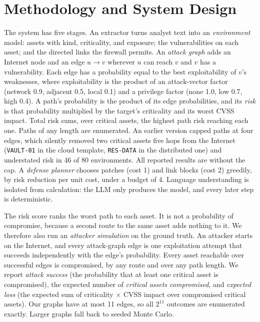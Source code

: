 \documentclass[11pt]{article}
\begin{document}
\section{Methodology and System Design}
The system has five stages. An extractor turns analyst text into an \emph{environment} model: assets with kind, criticality, and exposure; the vulnerabilities on each asset; and the directed links the firewall permits. An \emph{attack graph} adds an Internet node and an edge $u \rightarrow v$ wherever $u$ can reach $v$ and $v$ has a vulnerability. Each edge has a probability equal to the best exploitability of $v$'s weaknesses, where exploitability is the product of an attack-vector factor (network 0.9, adjacent 0.5, local 0.1) and a privilege factor (none 1.0, low 0.7, high 0.4). A path's probability is the product of its edge probabilities, and its \emph{risk} is that probability multiplied by the target's criticality and its worst CVSS impact. Total risk sums, over critical assets, the highest path risk reaching each one. Paths of any length are enumerated. An earlier version capped paths at four edges, which silently removed two critical assets five hops from the Internet (\texttt{VAULT-01} in the cloud template, \texttt{RES-DATA} in the distributed one) and understated risk in 46 of 80 environments. All reported results are without the cap. A \emph{defense planner} chooses patches (cost 1) and link blocks (cost 2) greedily, by risk reduction per unit cost, under a budget of 4. Language understanding is isolated from calculation: the LLM only produces the model, and every later step is deterministic.

The risk score ranks the worst path to each asset. It is not a probability of compromise, because a second route to the same asset adds nothing to it. We therefore also run an \emph{attacker simulation} on the ground truth. An attacker starts on the Internet, and every attack-graph edge is one exploitation attempt that succeeds independently with the edge's probability. Every asset reachable over successful edges is compromised, by any route and over any path length. We report \emph{attack success} (the probability that at least one critical asset is compromised), the expected number of \emph{critical assets compromised}, and \emph{expected loss} (the expected sum of criticality $\times$ CVSS impact over compromised critical assets). Our graphs have at most 11 edges, so all $2^{11}$ outcomes are enumerated exactly. Larger graphs fall back to seeded Monte Carlo.
\end{document}
